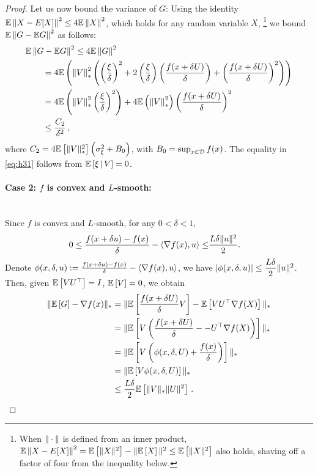 \begin{proof}
Let us now bound the variance of $G$:
Using the identity $\mathbb{E}\left\|X -  E[X]\right\|^2 \le 4 \mathbb{E} \left\|X\right\|^2$, which holds for any random variable $X$,%
\footnote{When $\|\cdot\|$ is defined from an inner product,
$\mathbb{E}\left\|X -  E[X]\right\|^2 = \mathbb{E}\left[\|X\|^2\right] - \|\mathbb{E}\left[X\right]\|^2 \le \mathbb{E}\left[\|X\|^2\right]$ also holds, shaving off a factor of four from the inequality below.}
we bound $\mathbb{E}\left\| G - \mathbb{E} G\right\|^2$ as follows:
\begin{align}
\MoveEqLeft \E\left\| G - \E G\right\|^2
 \le 4 \E \left\|G\right\|^2 \nonumber \\
& =  4\E\left( \left\| V \right\|_*^2 \left(\left(\dfrac{\xi}{\delta}\right)^2  + 2 \left(\dfrac{\xi}{\delta}\right) \left(\dfrac{f(x+\delta U)}{\delta}\right)
+ \left( \dfrac{f(x+\delta U) }{\delta} \right)^2 \right)\right) \nonumber \\
&=  4\E\left( \left\| V \right\|_*^2 \left(\dfrac{\xi}{\delta}\right)^2\right)
+ 4 \E \left(\left\| V \right\|_*^2 \right)\left( \dfrac{f(x+\delta U) }{\delta} \right)^2  \label{eq:h31} \\
& \le  \frac{C_2}{\delta^2}\,, \nonumber \label{eq:h41}
\end{align}
where $C_2 = 4 \mathbb{E}\left[\|V\|_*^2\right]\left( \sigma_\xi^2+B_0\right)$, with $B_0 = \sup_{x\in \mathcal{D}} f(x)$.
The equality in \eqref{eq:h31} follows from $\mathbb{E}\left[ \xi \,|\, V \right] = 0$.

\paragraph{Case 2: $f$ is convex and $L$-smooth:}\ \\
Since $f$ is convex and $L$-smooth, for any $0<\delta <1$,
\begin{align*}
 0 \le \frac{f(x + \delta u)-f(x)}{\delta}-\left\langle\nabla f(x), u\right\rangle \le&   \frac{L \delta \| u\|^2}{2}.
\end{align*}
Denote
$\phi(x,\delta,u):=\frac{f(x + \delta u)-f(x)}{\delta}-\left\langle\nabla f(x), u\right\rangle$, we have
$\left|\phi(x,\delta,u) \right| \le  \dfrac{L\delta}{2} \|u\|^2$.
Then,  given $\mathbb{E}\left[VU^\top\right]=I$, $\mathbb{E}\left[V\right]=0$, we obtain
\begin{align*}
\| \mathbb{E}\left[ G \right] - \nabla f(x) \|_*
&= \| \mathbb{E}\left[\frac{f(x + \delta U)}{\delta}V\right]-\mathbb{E}\left[VU^\top \nabla f(X)\right]  \|_*\\
&=\| \mathbb{E}\left[V\left( \frac{f(x + \delta U)}{\delta}- -U^\top \nabla f(X)\right)\right]  \|_*\\
&= \| \mathbb{E}\left[V\left( \phi(x,\delta,U)+\dfrac{f(x)}{\delta} \right)\right]  \|_*\\
&=\| \mathbb{E}\left[V\phi(x,\delta,U)\right] \|_*\\
&\le \dfrac{L\delta}{2}\mathbb{E}\left[\|V\|_*\|U\|^2\right]\,.
\end{align*}


\end{proof}
